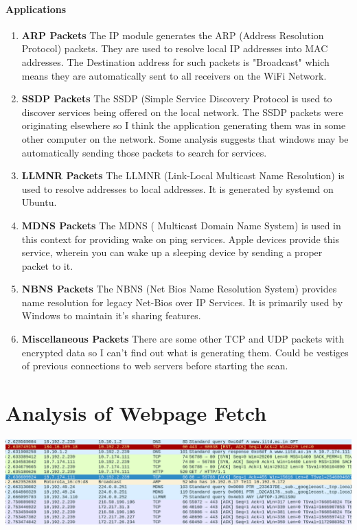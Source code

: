 \documentclass[12pt]{article}
\begin{document}
\paragraph{Applications}

\begin{enumerate}
\item \textbf{ARP Packets} The IP module generates the ARP (Address Resolution Protocol) packets. They are used to resolve local IP addresses into MAC addresses. The Destination address for such packets is "Broadcast" which means they are automatically sent to all receivers on the WiFi Network.
\item \textbf{SSDP Packets} The SSDP (Simple Service Discovery Protocol is used to discover services being offered on the local network. The SSDP packets were originating elsewhere so I think the application generating them was in some other computer on the network. Some analysis suggests that windows may be automatically sending those packets to search for services.
\item \textbf{LLMNR Packets} The LLMNR (Link-Local Multicast Name Resolution) is used to resolve addresses to local addresses. It is generated by systemd on Ubuntu.
\item \textbf{MDNS Packets} The MDNS ( Multicast Domain Name System) is used  in this context for providing wake on ping services. Apple devices provide this service, wherein you can wake up a sleeping device by sending a proper packet to it.
\item \textbf{NBNS Packets} The NBNS (Net Bios Name Resolution System) provides name resolution for legacy Net-Bios over IP Services. It is primarily used by Windows to maintain it's sharing features.
\item \textbf{Miscellaneous Packets} There are some other TCP and UDP packets with encrypted data so I can't find out what is generating them. Could be vestiges of previous connections to web servers before starting the scan.
\end{enumerate}

\section{Analysis of Webpage Fetch}


\begin{center}
\includegraphics[scale=0.3]{f5}
\end{center}
\end{document}
